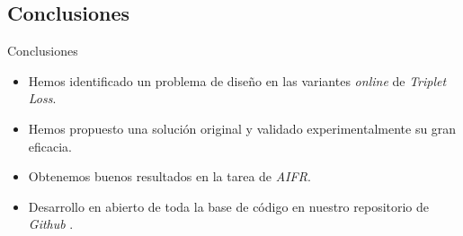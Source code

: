 \subsection{Conclusiones}
\begin{frame}{Conclusiones}

	\begin{itemize}
		\item Hemos identificado un problema de diseño en las variantes \textit{online} de \textit{Triplet Loss}.
		\item Hemos propuesto una solución original y validado experimentalmente su gran eficacia.
		\item Obtenemos buenos resultados en la tarea de \textit{AIFR}.
		\item Desarrollo en abierto de toda la base de código en nuestro repositorio de \textit{Github} .
	\end{itemize}

\end{frame}
